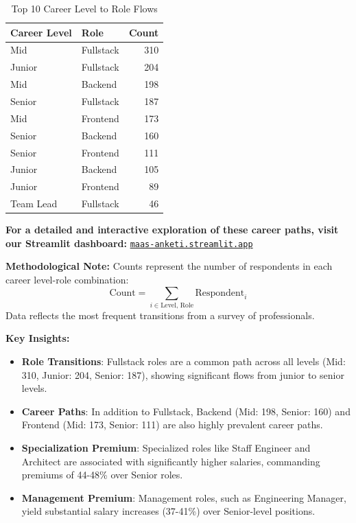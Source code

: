 \documentclass[12pt,a4paper]{article}
\begin{document}
\begin{table}[H]
    \centering
    \small
    \begin{tabular}{llr}
        \toprule
        \textbf{Career Level} & \textbf{Role} & \textbf{Count} \\
        \midrule
        Mid                   & Fullstack     & 310            \\
        Junior                & Fullstack     & 204            \\
        Mid                   & Backend       & 198            \\
        Senior                & Fullstack     & 187            \\
        Mid                   & Frontend      & 173            \\
        Senior                & Backend       & 160            \\
        Senior                & Frontend      & 111            \\
        Junior                & Backend       & 105            \\
        Junior                & Frontend      & 89             \\
        Team Lead             & Fullstack     & 46             \\
        \bottomrule
    \end{tabular}
    \caption{Top 10 Career Level to Role Flows}
\end{table}

\textbf{For a detailed and interactive exploration of these career paths, visit our Streamlit dashboard:} \href{http://maas-anketi.streamlit.app/#career-level-role-flow-sankey}{\texttt{maas-anketi.streamlit.app}}

\textbf{Methodological Note:} Counts represent the number of respondents in each career level-role combination:
\[
    \text{Count} = \sum_{i \in \text{Level, Role}} \text{Respondent}_i
\]
Data reflects the most frequent transitions from a survey of professionals.

\textbf{Key Insights:}
\begin{itemize}
    \item \textbf{Role Transitions}: Fullstack roles are a common path across all levels (Mid: 310, Junior: 204, Senior: 187), showing significant flows from junior to senior levels.
    \item \textbf{Career Paths}: In addition to Fullstack, Backend (Mid: 198, Senior: 160) and Frontend (Mid: 173, Senior: 111) are also highly prevalent career paths.
    \item \textbf{Specialization Premium}: Specialized roles like Staff Engineer and Architect are associated with significantly higher salaries, commanding premiums of 44-48\% over Senior roles.
    \item \textbf{Management Premium}: Management roles, such as Engineering Manager, yield substantial salary increases (37-41\%) over Senior-level positions.
\end{itemize}
\end{document}
